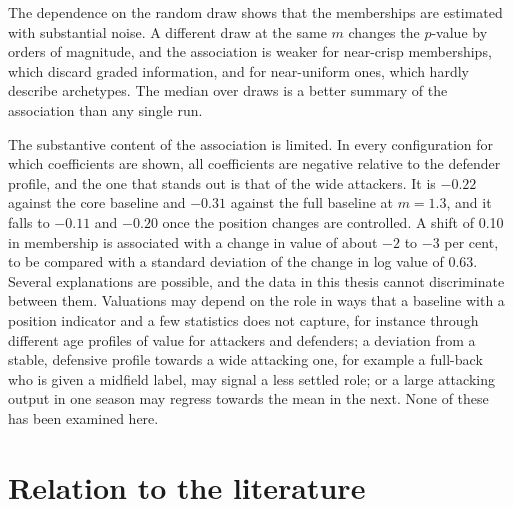 The dependence on the random draw shows that the memberships are estimated with substantial noise. A different draw at the same $m$ changes the $p$-value by orders of magnitude, and the association is weaker for near-crisp memberships, which discard graded information, and for near-uniform ones, which hardly describe archetypes. The median over draws is a better summary of the association than any single run.

The substantive content of the association is limited. In every configuration for which coefficients are shown, all coefficients are negative relative to the defender profile, and the one that stands out is that of the wide attackers. It is $-0.22$ against the core baseline and $-0.31$ against the full baseline at $m=1.3$, and it falls to $-0.11$ and $-0.20$ once the position changes are controlled. A shift of 0.10 in membership is associated with a change in value of about $-2$ to $-3$ per cent, to be compared with a standard deviation of the change in log value of 0.63. Several explanations are possible, and the data in this thesis cannot discriminate between them. Valuations may depend on the role in ways that a baseline with a position indicator and a few statistics does not capture, for instance through different age profiles of value for attackers and defenders; a deviation from a stable, defensive profile towards a wide attacking one, for example a full-back who is given a midfield label, may signal a less settled role; or a large attacking output in one season may regress towards the mean in the next. None of these has been examined here.

\section{Relation to the literature}
\label{sec:disc-literature}

